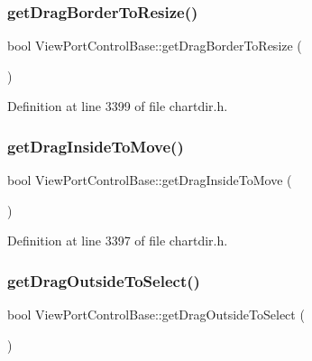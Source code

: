 \subsubsection{\texorpdfstring{get\+Drag\+Border\+To\+Resize()}{getDragBorderToResize()}}
{\footnotesize\ttfamily bool View\+Port\+Control\+Base\+::get\+Drag\+Border\+To\+Resize (\begin{DoxyParamCaption}{ }\end{DoxyParamCaption})\hspace{0.3cm}{\ttfamily [inline]}}



Definition at line 3399 of file chartdir.\+h.

\mbox{\label{class_view_port_control_base_a60ce33b7ae39dbc6892f31c0f389d91a}} 
\subsubsection{\texorpdfstring{get\+Drag\+Inside\+To\+Move()}{getDragInsideToMove()}}
{\footnotesize\ttfamily bool View\+Port\+Control\+Base\+::get\+Drag\+Inside\+To\+Move (\begin{DoxyParamCaption}{ }\end{DoxyParamCaption})\hspace{0.3cm}{\ttfamily [inline]}}



Definition at line 3397 of file chartdir.\+h.

\mbox{\label{class_view_port_control_base_a642468794fd458edc3e06fc4cc8f9a5e}} 
\subsubsection{\texorpdfstring{get\+Drag\+Outside\+To\+Select()}{getDragOutsideToSelect()}}
{\footnotesize\ttfamily bool View\+Port\+Control\+Base\+::get\+Drag\+Outside\+To\+Select (\begin{DoxyParamCaption}{ }\end{DoxyParamCaption})\hspace{0.3cm}{\ttfamily [inline]}}



